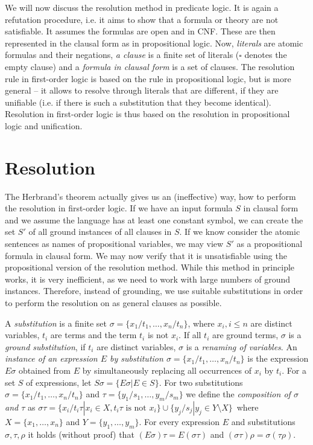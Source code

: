 We will now discuss the resolution method in predicate logic. It is again a refutation procedure, i.e. it aims to show that a formula or theory are not satisfiable. It assumes the formulas are open and in CNF. These are then represented in the clausal form as in propositional logic. Now, \emph{literals} are atomic formulas and their negations, \emph{a clause} is a finite set of literals ($\square$ denotes the empty clause) and a \emph{formula in clausal form} is a set of clauses. The resolution rule in first-order logic is based on the rule in propositional logic, but is more general -- it allows to resolve through literals that are different, if they are unifiable (i.e. if there is such a substitution that they become identical). Resolution in first-order logic is thus based on the resolution in propositional logic and unification.

\section{Resolution}

The Herbrand's theorem actually gives us an (ineffective) way, how to perform the resolution in first-order logic. If we have an input formula $S$ in clausal form and we assume the language has at least one constant symbol, we can create the set $S'$ of all ground instances of all clauses in $S$. If we know consider the atomic sentences as names of propositional variables, we may view $S'$ as a propositional formula in clausal form. We may now verify that it is unsatisfiable using the propositional version of the resolution method. While this method in principle works, it is very inefficient, as we need to work with large numbers of ground instances. Therefore, instead of grounding, we use suitable substitutions in order to perform the resolution on as general clauses as possible.

A \emph{substitution} is a finite set $\sigma = \{x_1/t_1, \dots, x_n/t_n\}$, where $x_i, i \leq n$ are distinct variables, $t_i$ are terms and the term $t_i$ is not $x_i$. If all $t_i$ are ground terms, $\sigma$ is a \emph{ground substitution}, if $t_i$ are distinct variables, $\sigma$ is a \emph{renaming of variables}. An \emph{instance of an expression $E$ by substitution $\sigma = \{x_1/t_1, \dots, x_n/t_n\}$} is the expression $E \sigma$ obtained from $E$ by simultaneously replacing all occurrences of $x_i$ by $t_i$. For a set $S$ of expressions, let $S \sigma = \{E \sigma| E \in S\}$. For two substitutions $\sigma = \{x_1/t_1, \dots, x_n/t_n\}$ and $\tau = \{y_1/s_1, \dots, y_m/s_m\}$ we define the \emph{composition of $\sigma$ and $\tau$} as $\sigma \tau = \{x_i/t_i \tau| x_i \in X, t_i \tau\text{ is not }x_i\} \cup \{y_j/s_j|y_j \in Y \setminus X\}\,$ where $X = \{x_1, \dots, x_n\}$ and $Y = \{y_1, \dots, y_m\}$. For every expression $E$ and substitutions $\sigma, \tau, \rho$ it holds (without proof) that $(E \sigma)\tau = E(\sigma \tau)$ and $(\sigma \tau)\rho = \sigma(\tau \rho)$.


